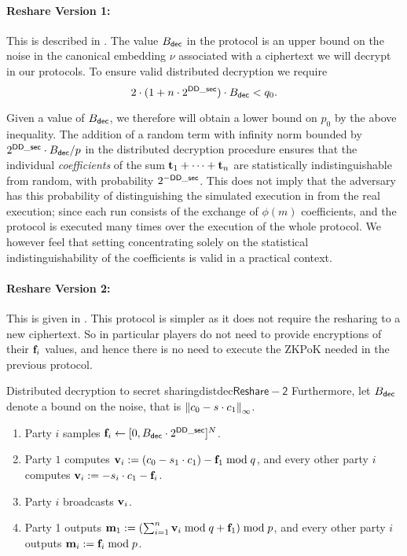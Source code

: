 \paragraph{Reshare Version 1:}
This is described in .
The value $B_{\mathsf{dec}}$ in the protocol is an upper bound on the noise in the canonical embedding
$\nu$ associated with a ciphertext we will decrypt in our protocols.
To ensure valid distributed decryption we require
\[ 2 \cdot (1+n \cdot 2^{\mathsf{DD\_sec}}) \cdot B_{\mathsf{dec}} < q_{0}. \]

Given a value of $B_{\mathsf{dec}}$, we therefore will obtain a lower bound
on $p_0$ by the above inequality.
The addition of a random term with infinity norm bounded by
$2^{\mathsf{DD\_sec}} \cdot B_{\mathsf{dec}}/p$ in the distributed decryption procedure
ensures that the individual {\em coefficients} of the sum
$\mathbf{t}_1+\cdots+\mathbf{t}_n$ are statistically indistinguishable from
random, with probability $2^{-\mathsf{DD\_sec}}$.
This does not imply that the adversary has this probability of
distinguishing the simulated execution in \cite{SPDZ} from the
real execution; since each run consists of the exchange of
$\phi(m)$ coefficients, and the protocol is executed many times
over the execution of the whole protocol.
We however feel that setting concentrating solely on the
statistical indistinguishability of the coefficients is valid
in a practical context.

\paragraph{Reshare Version 2:}
This is given in .
This protocol is simpler as it does not require the resharing to a
new ciphertext.
So in particular players do not need to provide encryptions of
their $\mathbf{f}_i$ values, and hence there is no need
to execute the ZKPoK needed in the previous protocol.

\begin{Boxfig}{Distributed decryption to secret
    sharing}{distdec}{$\mathsf{Reshare-2}$}
  Furthermore, let $B_{\mathsf{dec}}$ denote a bound on the noise, that is ${\Vert c_0 - s \cdot c_1 \Vert}_\infty$.
  \begin{enumerate}
    \item Party $i$ samples $\mathbf{f}_i \leftarrow [0,B_{\mathsf{dec}} \cdot 2^{\mathsf{DD\_sec}}]^N$.
    \item Party $1$ computes
          $\mathbf{v}_i := (c_0 - s_1 \cdot c_1) - \mathbf{f}_1 \bmod q$, and every other
          party $i$ computes $\mathbf{v}_i :=  -s_i \cdot c_1- \mathbf{f}_i$.
    \item Party $i$ broadcasts $\mathbf{v}_i$.
    \item Party 1 outputs
          $\mathbf{m}_1 := (\sum_{i=1}^n \mathbf{v}_i \bmod q + \mathbf{f}_1) \bmod p$, and
          every other party $i$ outputs $\mathbf{m}_i := \mathbf{f}_i \bmod p$.
  \end{enumerate}
\end{Boxfig}





